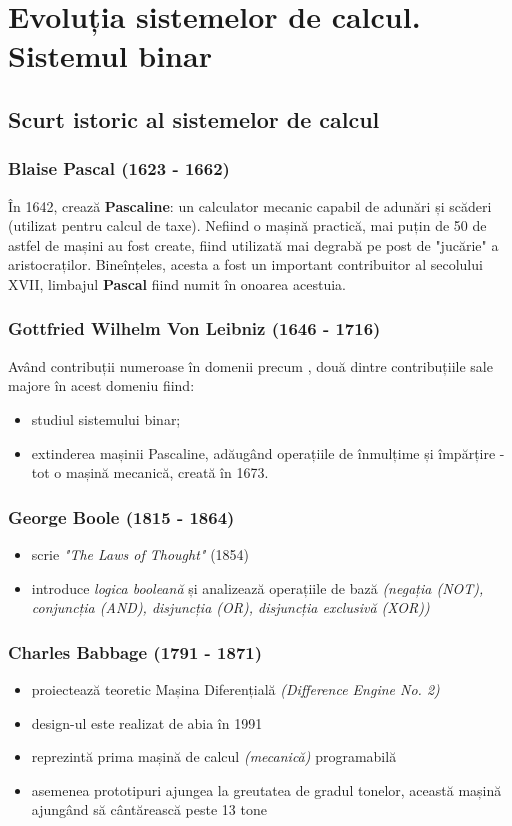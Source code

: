 \documentclass[a4paper,10pt]{article}
\begin{document}
\section{Evoluția sistemelor de calcul. Sistemul binar}
\subsection{Scurt istoric al sistemelor de calcul}
\begin{multicols}{2}
\subsubsection{Blaise Pascal (1623 - 1662)}
În 1642, crează \textbf{Pascaline}: un calculator mecanic capabil de adunări și scăderi (utilizat pentru calcul de taxe). Nefiind o mașină practică, mai puțin de 50 de astfel de mașini au fost create, fiind utilizată mai degrabă pe post de "jucărie" a aristocraților. Bineînțeles, acesta a fost un important contribuitor al secolului XVII, limbajul \textbf{Pascal} fiind numit în onoarea acestuia. 
\subsubsection{Gottfried Wilhelm Von Leibniz (1646 - 1716)}
Având contribuții numeroase în domenii precum , două dintre contribuțiile sale majore în acest domeniu fiind:
\begin{itemize}
    \item studiul sistemului binar;
    \item extinderea mașinii Pascaline, adăugând operațiile de înmulțime și împărțire - tot o mașină mecanică, creată în 1673.
\end{itemize}
\subsubsection{George Boole (1815 - 1864)}
\begin{itemize}
    \item scrie \textit{"The Laws of Thought"} (1854)
    \item introduce \textit{logica booleană} și analizează operațiile de bază \textit{(negația (NOT), conjuncția (AND), disjuncția (OR), disjuncția exclusivă (XOR))}
\end{itemize}
\subsubsection{Charles Babbage (1791 - 1871)}
\begin{itemize}
    \item proiectează teoretic Mașina Diferențială \textit{(Difference Engine No. 2)}
    \item design-ul este realizat de abia în 1991
    \item reprezintă prima mașină de calcul \textit{(mecanică)} programabilă
    \item asemenea prototipuri ajungea la greutatea de gradul tonelor, această mașină ajungând să cântărească peste 13 tone
\end{itemize}

\end{multicols}
\end{document}
